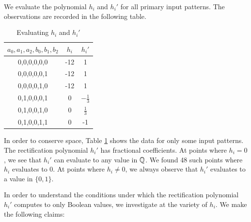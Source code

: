\begin{Example}
We evaluate the polynomial $h_i$ and $h_i'$ for all primary input patterns. The observations are recorded in the following table. 
\vspace{2mm}
\begin{table}[ht]
    \centering
    \begin{tabular}{|c|c|c|} \hline
      $a_0,a_1,a_2,b_0,b_1,b_2$ & $h_i$ & $h_i'$ \\ \hline
       0,0,0,0,0,0 & -12 & 1\\ \hline
       0,0,0,0,0,1 & -12 & 1\\ \hline
       0,0,0,0,1,0 & -12 & 1\\ \hline
       0,1,0,0,0,1 & 0 & $-\frac{1}{3}$\\ \hline
       0,1,0,0,1,0 & 0 & $\frac{1}{3}$\\ \hline
       0,1,0,0,1,1 & 0 & -1 \\ \hline
    \end{tabular}
    \caption{Evaluating $h_i$ and $h_i'$}
    \label{tab:quosol}
\end{table}

In order to conserve space, Table \ref{tab:quosol} shows the data for
only some input patterns.
The rectification polynomial $h_i'$ has
fractional coefficients. At points where $h_i = 0$, we see that $h_i'$
can evaluate to any value in ${\mathbb{Q}}$. We found 48 such points where $h_i$
evaluates to 0. At points where $h_i \neq 0$, we always observe that $h_i'$
evaluates to a value in $\{0,1\}$. 
\end{Example}

In order to understand the conditions under which the rectification
polynomial $h_i'$ computes to only Boolean values, we investigate at the
variety of $h_i$. We make the following claims:


